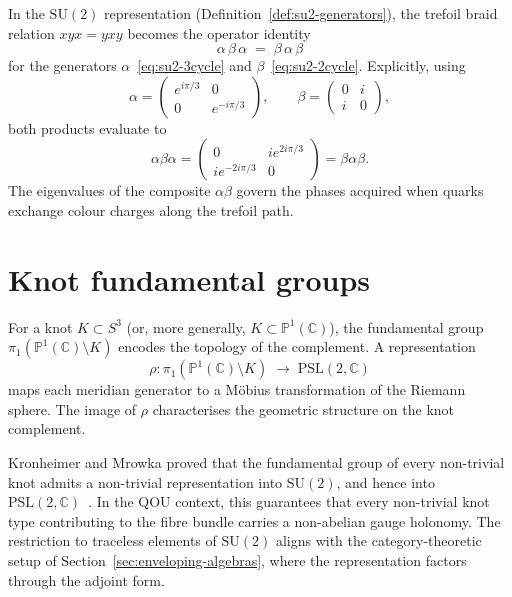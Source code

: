 \begin{example}
\label{ex:trefoil-operator-algebra}
In the $\mathrm{SU}(2)$ representation
(Definition~\ref{def:su2-generators}), the trefoil braid relation
$xyx=yxy$ becomes the operator identity
\[
  \alpha\,\beta\,\alpha
  \;=\;\beta\,\alpha\,\beta
\]
for the generators $\alpha$~\eqref{eq:su2-3cycle} and
$\beta$~\eqref{eq:su2-2cycle}.  Explicitly, using
\[
  \alpha=\begin{pmatrix}e^{i\pi/3}&0\\0&e^{-i\pi/3}\end{pmatrix},
  \qquad
  \beta=\begin{pmatrix}0&i\\i&0\end{pmatrix},
\]
both products evaluate to
\[
  \alpha\beta\alpha
  = \begin{pmatrix}0&ie^{2i\pi/3}\\ie^{-2i\pi/3}&0\end{pmatrix}
  = \beta\alpha\beta.
\]
The eigenvalues of the composite $\alpha\beta$ govern the phases
acquired when quarks exchange colour charges along the trefoil path.
\end{example}


\section{Knot fundamental groups}
\label{sec:knot-fundamental-groups}

\begin{remark}
\label{rem:knot-complement-group}
For a knot $K\subset S^3$ (or, more generally,
$K\subset\mathbb{P}^1(\mathbb{C})$), the fundamental group
$\pi_1(\mathbb{P}^1(\mathbb{C})\setminus K)$ encodes the topology of the
complement.  A representation
\[
  \rho\colon\pi_1(\mathbb{P}^1(\mathbb{C})\setminus K)
  \;\longrightarrow\;\mathrm{PSL}(2,\mathbb{C})
\]
maps each meridian generator to a M\"obius transformation of the
Riemann sphere.  The image of $\rho$ characterises the geometric
structure on the knot complement.
\end{remark}

\begin{remark}
\label{rem:kronheimer-mrowka}
Kronheimer and Mrowka proved that the fundamental group of every
non-trivial knot admits a non-trivial representation into
$\mathrm{SU}(2)$, and hence into
$\mathrm{PSL}(2,\mathbb{C})$~\cite{KronheimerMrowka2004}.  In the
QOU context, this guarantees that every non-trivial knot type
contributing to the fibre bundle carries a non-abelian gauge holonomy.
The restriction to traceless elements of $\mathrm{SU}(2)$ aligns with
the category-theoretic setup of Section~\ref{sec:enveloping-algebras},
where the representation factors through the adjoint form.
\end{remark}

